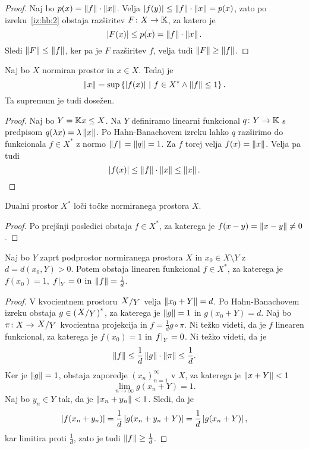 \begin{proof}
Naj bo $p(x) = \left\lVert f\right\rVert \cdot \left\lVert x\right\rVert$. Velja
$\left\lvert f(y)\right\rvert \leq \left\lVert f\right\rVert \cdot \left\lVert x\right\rVert = p(x)$, zato po
izreku~\ref{iz:hb:2} obstaja razširitev $F \colon X \to \mathbb{K}$, za
katero je
\[
\left\lvert F(x)\right\rvert \leq p(x) = \left\lVert f\right\rVert \cdot \left\lVert x\right\rVert.
\]
Sledi $\left\lVert F\right\rVert \leq \left\lVert f\right\rVert$, ker pa je $F$ razširitev $f$, velja
tudi $\left\lVert F\right\rVert \geq \left\lVert f\right\rVert$.
\end{proof}

\begin{posledica}\label{ps:hb:1}
Naj bo $X$ normiran prostor in $x \in X$. Tedaj je
\[
\left\lVert x\right\rVert = \sup \left\{\left\lvert f(x)\right\rvert~\middle\vert~f \in X^* \land \left\lVert f\right\rVert \leq 1\right\}.
\]
Ta supremum je tudi dosežen.
\end{posledica}

\begin{proof}
Naj bo $Y = \mathbb{K} x \leq X$. Na $Y$ definiramo linearni funkcional
$q \colon Y \to \mathbb{K}$ s predpisom $q(\lambda x) = \lambda \left\lVert x\right\rVert$.
Po Hahn-Banachovem izreku lahko $q$ razširimo do funkcionala
$f \in X^*$ z normo $\left\lVert f\right\rVert = \left\lVert q\right\rVert = 1$. Za $f$ torej velja
$f(x) = \left\lVert x\right\rVert$. Velja pa tudi
\[
\left\lvert f(x)\right\rvert \leq \left\lVert f\right\rVert \cdot \left\lVert x\right\rVert \leq \left\lVert x\right\rVert. \qedhere
\]
\end{proof}

\begin{posledica}
Dualni prostor $X^*$ loči točke normiranega prostora $X$.
\end{posledica}

\begin{proof}
Po prejšnji posledici obstaja $f \in X^*$, za katerega je
$f(x-y) = \left\lVert x-y\right\rVert \ne 0$.
\end{proof}

\begin{posledica}
Naj bo $Y$ zaprt podprostor normiranega prostora $X$ in
$x_0 \in X \setminus Y$ z $d = d(x_0, Y) > 0$. Potem obstaja
linearen funkcional $f \in X^*$, za katerega je $f(x_0) = 1$,
$\left. f\right|_{Y}^{} = 0$ in $\left\lVert f\right\rVert = \frac{1}{d}$.
\end{posledica}

\begin{proof}
V kvocientnem prostoru $\kvoc{X}{Y}$ velja $\left\lVert x_0 + Y\right\rVert = d$. Po
Hahn-Banachovem izreku obstaja $g \in \left(\kvoc{X}{Y}\right)^*$,
za katerega je $\left\lVert g\right\rVert = 1$ in $g(x_0 + Y) = d$. Naj bo
$\pi \colon X \to \kvoc{X}{Y}$ kvocientna projekcija in
$f = \frac{1}{d} g \circ \pi$. Ni težko videti, da je $f$ linearen
funkcional, za katerega je $f(x_0) = 1$ in $\left. f\right|_{Y}^{} = 0$.
Ni težko videti, da je
\[
\left\lVert f\right\rVert \leq
\frac{1}{d} \left\lVert g\right\rVert \cdot \left\lVert \pi\right\rVert \leq \frac{1}{d}.
\]
Ker je $\left\lVert g\right\rVert = 1$, obstaja zaporedje $(x_n)_{n=1}^\infty$ v
$X$, za katerega je $\left\lVert x + Y\right\rVert < 1$
\[
\lim_{n \to \infty} g(x_n + Y) = 1.
\]
Naj bo $y_n \in Y$ tak, da je $\left\lVert x_n + y_n\right\rVert < 1$. Sledi, da je
\[
\left\lvert f(x_n + y_n)\right\rvert = \frac{1}{d} \left\lvert g(x_n + y_n + Y)\right\rvert =
\frac{1}{d} \left\lvert g(x_n + Y)\right\rvert,
\]
kar limitira proti $\frac{1}{d}$, zato je tudi
$\left\lVert f\right\rVert \geq \frac{1}{d}$.
\end{proof}

